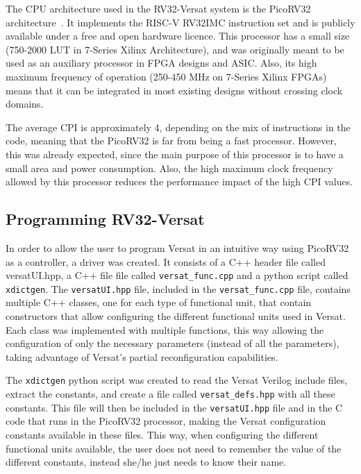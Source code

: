 \documentclass[conference]{IEEEtran}
\begin{document}
The \ac{CPU} architecture used in the RV32-Versat system is the PicoRV32
architecture~\cite{cliffordwolf:picorv32}. It implements the RISC-V RV32IMC
instruction set and is publicly available under a free and open hardware
licence. This processor has a small size (750-2000 \ac{LUT} in 7-Series Xilinx
Architecture), and was originally meant to be used as an auxiliary processor in
\ac{FPGA} designs and \ac{ASIC}. Also, its high maximum frequency of operation
(250-450 MHz on 7-Series Xilinx FPGAs) means that it can be integrated in most
existing designs without crossing clock domains.

The average \ac{CPI} is approximately 4, depending on the mix of instructions in the 
code, meaning that the PicoRV32 is far from being a fast processor. However, this was 
already expected, since the main purpose of this processor is to have a small area and 
power consumption. Also, the high maximum clock frequency allowed by this processor 
reduces the performance impact of the high \ac{CPI} values.


\subsection{Programming RV32-Versat}
\label{section:programming}

In order to allow the user to program Versat in an intuitive way using PicoRV32
as a controller, a driver was created. It consists of a C++ header file called
versatUI.hpp, a C++ file file called {\tt versat\_func.cpp} and a python script called
{\tt xdictgen}. The {\tt versatUI.hpp} file, included in the {\tt versat\_func.cpp} file, 
contains multiple C++ classes, one for each type of functional unit, that contain
constructors that allow configuring the different functional units used in
Versat. Each class was implemented with
multiple functions, this way allowing the configuration of only the necessary
parameters (instead of all the parameters), taking advantage of Versat's partial
reconfiguration capabilities.

The {\tt xdictgen} python script was created to read the Versat Verilog include
files, extract the constants, and create a file called {\tt versat\_defs.hpp} with
all these constants. This file will then be included in the {\tt versatUI.hpp} file and
in the C code that runs in the PicoRV32 processor, making the Versat
configuration constants available in these files. This way, when configuring the
different functional units available, the user does not need to remember the
value of the different constants, instead she/he just needs to know their name.
\end{document}
